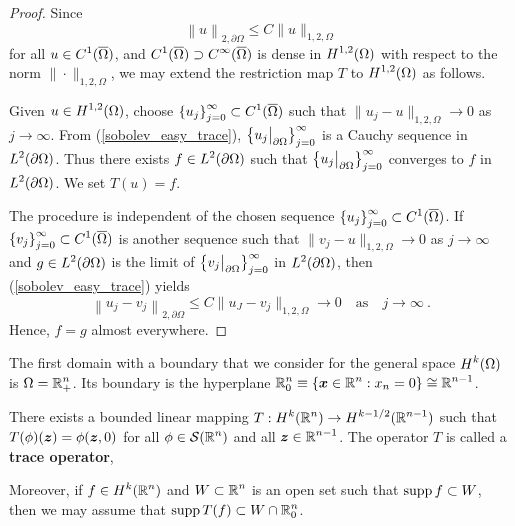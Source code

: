 \begin{proof}
Since 
\begin{equation} \label{sobolev_easy_trace}
\left\| u \right\|_{2,\partial \Omega}
\leq C \| u\|_{1,2,\Omega}
\end{equation}
for all $\displaystyle u \in C^1(\overline{\Omega})$, 
and $\displaystyle C^1(\overline{\Omega}) \supset C^\infty(\overline{\Omega})$
is dense in $\displaystyle H^{1,2}(\Omega)$ with
respect to the norm $\|\cdot\|_{1,2,\Omega}$, we may
extend the restriction map $T$ to $\displaystyle H^{1,2}(\Omega)$ as follows.

Given $\displaystyle u\in H^{1,2}(\Omega)$, choose
$\displaystyle \left\{ u_j\right\}_{j=0}^\infty
\subset C^1(\overline{\Omega})$ such that
$\|u_j - u\|_{1,2,\Omega} \rightarrow 0$ as $j\rightarrow \infty$.
From (\ref{sobolev_easy_trace}),
$\displaystyle \left\{ u_j\big|_{\partial \Omega} \right\}_{j=0}^\infty$ is a
Cauchy sequence in $\displaystyle L^2(\partial \Omega)$.  Thus there exists
$\displaystyle f \in L^2(\partial \Omega)$ such
that $\displaystyle \left\{ u_j\big|_{\partial \Omega} \right\}_{j=0}^\infty$
converges to $f$ in $\displaystyle L^2(\partial \Omega)$.  We set $T(u) = f$.

The procedure is independent of the chosen sequence 
$\displaystyle \left\{ u_j\right\}_{j=0}^\infty \subset C^1(\overline{\Omega})$.
If
$\displaystyle \left\{ v_j\right\}_{j=0}^\infty \subset C^1(\overline{\Omega})$
is another sequence such that
$\|v_j - u\|_{1,2,\Omega} \rightarrow 0$ as $j\rightarrow \infty$ and
$\displaystyle g \in L^2(\partial \Omega)$ is the limit of
$\displaystyle \left\{ v_j\big|_{\partial \Omega} \right\}_{j=0}^\infty$ in
$\displaystyle L^2(\partial \Omega)$, then (\ref{sobolev_easy_trace}) yields
\[
\left\| u_j - v_j \right\|_{2,\partial \Omega}
\leq C \| u_J - v_j\|_{1,2,\Omega} \rightarrow 0 \quad \text{as} \quad 
j\rightarrow \infty \ .
\]
Hence, $f=g$ almost everywhere.
\end{proof}

The first domain with a boundary that we consider for the general space
$\displaystyle H^k(\Omega)$ is $\displaystyle \Omega = \mathbb{R}^n_+$.
Its boundary is the hyperplane
$\displaystyle \mathbb{R}^n_0 \equiv \{ {\bm{x}}\in \mathbb{R}^n : x_n = 0 \} \cong \mathbb{R}^{n-1}$.

\begin{prop} \label{TraceRnRnp}
There exists a bounded linear mapping
$\displaystyle T:H^k(\mathbb{R}^n) \rightarrow H^{k-1/2}(\mathbb{R}^{n-1})$
such that
$\displaystyle T(\phi)({\bm{z}}) = \phi({\bm{z}},0)$
for all $\displaystyle \phi\in\mathcal{S}(\mathbb{R}^n)$ and all
$\displaystyle {\bm{z}} \in \mathbb{R}^{n-1}$.
The operator $T$ is called a
{\bfseries trace operator},

Moreover, if $\displaystyle f \in H^k(\mathbb{R}^n)$ and
$\displaystyle W \subset \mathbb{R}^n$ is an open set
such that $\operatorname{supp} f \subset W$, then we may assume that
$\displaystyle \operatorname{supp} T(f) \subset W \cap \mathbb{R}^n_0$.
\end{prop}

